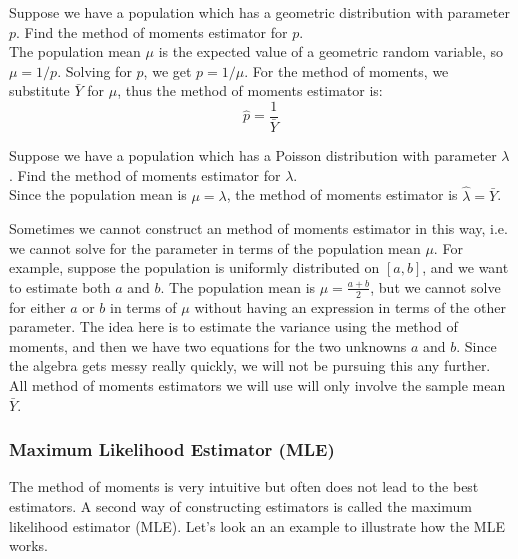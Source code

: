 \documentclass[notes.tex]{subfiles}
\begin{document}
\begin{example}Suppose we have a population which has a geometric distribution with parameter $p$. Find the method of moments estimator for $p$.\\

The population mean $\mu$ is the expected value of a geometric random variable, so $\mu = 1 / p$. Solving for $p$, we get $p = 1 / \mu$. For the method of moments, we substitute $\bar{Y}$ for $\mu$, thus the method of moments estimator is:
\[
\hat{p} = \frac{1}{\bar{Y}}
\]
\end{example}

\begin{example}Suppose we have a population which has a Poisson distribution with parameter $\lambda$. Find the method of moments estimator for $\lambda$.\\

Since the population mean is $\mu = \lambda$, the method of moments estimator is $\hat{\lambda} = \bar{Y}$.
\end{example}

Sometimes we cannot construct an method of moments estimator in this way, i.e. we cannot solve for the parameter in terms of the population mean $\mu$. For example, suppose the population is uniformly distributed on $[a, b]$, and we want to estimate both $a$ and $b$. The population mean is $\mu = \frac{a + b}{2}$, but we cannot solve for either $a$ or $b$ in terms of $\mu$ without having an expression in terms of the other parameter. The idea here is to estimate the variance using the method of moments, and then we have two equations for the two unknowns $a$ and $b$. Since the algebra gets messy really quickly, we will not be pursuing this any further. All method of moments estimators we will use will only involve the sample mean $\bar{Y}$.

\subsubsection{Maximum Likelihood Estimator (MLE)}
The method of moments is very intuitive but often does not lead to the best estimators. A second way of constructing estimators is called the maximum likelihood estimator (MLE). Let's look an an example to illustrate how the MLE works.
\end{document}

